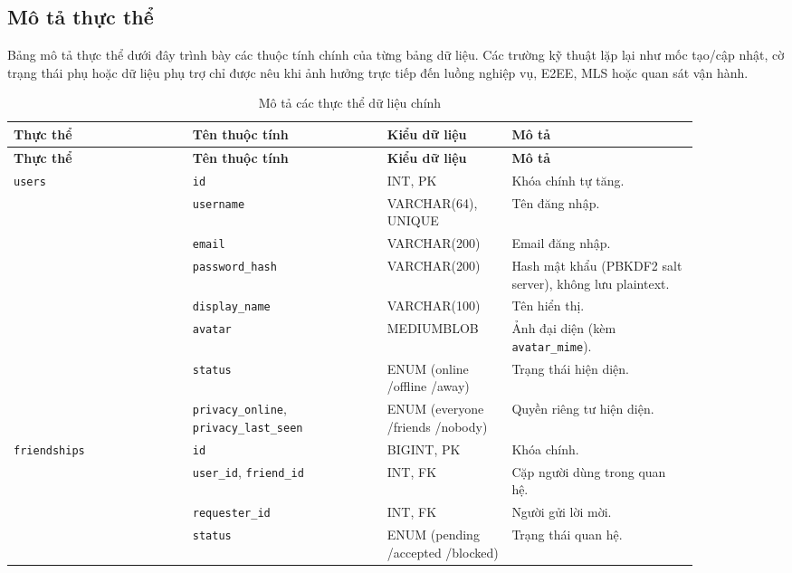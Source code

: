 \subsection{Mô tả thực thể}

Bảng mô tả thực thể dưới đây trình bày các thuộc tính chính của từng bảng dữ liệu. Các trường kỹ thuật lặp lại như mốc tạo/cập nhật, cờ trạng thái phụ hoặc dữ liệu phụ trợ chỉ được nêu khi ảnh hưởng trực tiếp đến luồng nghiệp vụ, E2EE, MLS hoặc quan sát vận hành.

{\footnotesize
\begin{longtable}{|p{0.23\linewidth}|p{0.25\linewidth}|p{0.16\linewidth}|p{0.24\linewidth}|}
\caption{Mô tả các thực thể dữ liệu chính}\label{tab:entity-detail}\\
\hline
\textbf{Thực thể} & \textbf{Tên thuộc tính} & \textbf{Kiểu dữ liệu} & \textbf{Mô tả} \\ \hline
\endfirsthead
\hline
\textbf{Thực thể} & \textbf{Tên thuộc tính} & \textbf{Kiểu dữ liệu} & \textbf{Mô tả} \\ \hline
\endhead
\texttt{users} & \texttt{id} & INT, PK & Khóa chính tự tăng. \\ \cline{2-4}
 & \texttt{username} & VARCHAR(64), UNIQUE & Tên đăng nhập. \\ \cline{2-4}
 & \texttt{email} & VARCHAR(200) & Email đăng nhập. \\ \cline{2-4}
 & \texttt{password\_hash} & VARCHAR(200) & Hash mật khẩu (PBKDF2 salt server), không lưu plaintext. \\ \cline{2-4}
 & \texttt{display\_name} & VARCHAR(100) & Tên hiển thị. \\ \cline{2-4}
 & \texttt{avatar} & MEDIUMBLOB & Ảnh đại diện (kèm \texttt{avatar\_mime}). \\ \cline{2-4}
 & \texttt{status} & ENUM (online /offline /away) & Trạng thái hiện diện. \\ \cline{2-4}
 & \texttt{privacy\_online}, \texttt{privacy\_last\_seen} & ENUM (everyone /friends /nobody) & Quyền riêng tư hiện diện. \\ \hline
\texttt{friendships} & \texttt{id} & BIGINT, PK & Khóa chính. \\ \cline{2-4}
 & \texttt{user\_id}, \texttt{friend\_id} & INT, FK & Cặp người dùng trong quan hệ. \\ \cline{2-4}
 & \texttt{requester\_id} & INT, FK & Người gửi lời mời. \\ \cline{2-4}
 & \texttt{status} & ENUM (pending /accepted /blocked) & Trạng thái quan hệ. \\ \hline

\end{longtable}}
